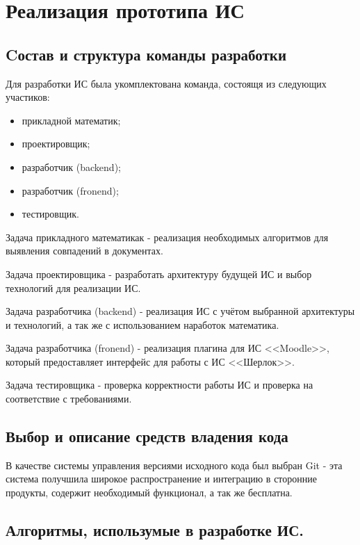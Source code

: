 \section{Реализация прототипа ИС}
	
	\subsection{Cостав и структура команды разработки}

		Для разработки ИС была укомплектована команда, состоящя из следующих участиков:
		\begin{itemize}			
			\item прикладной математик;
			\item проектировщик;
			\item разработчик (backend);
			\item разработчик (fronend);
			\item тестировщик.
		\end{itemize}

		Задача прикладного математикак - реализация необходимых алгоритмов для выявления совпадений в документах.

		Задача проектировщика - разработать архитектуру будущей ИС и выбор технологий для реализации ИС.

		Задача разработчика (backend) - реализация ИС с учётом выбранной архитектуры и технологий, а так же с использованием наработок математика.

		Задача разработчика (fronend) - реализация плагина для ИС <<Moodle>>, который предоставляет интерфейс для работы с ИС <<Шерлок>>.

		Задача тестировщика - проверка корректности работы ИС и проверка на соответствие с требованиями.

	\subsection{Выбор и описание средств владения кода}

		В качестве системы управления версиями исходного кода был выбран Git - эта система получшила широкое распространение и интеграцию в сторонние продукты, содержит необходимый функционал, а так же бесплатна. 

	\subsection{Алгоритмы, использумые в разработке ИС.}

